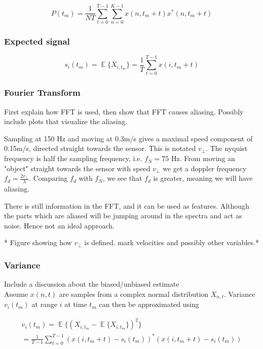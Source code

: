 \documentclass[a4paper, 12pt]{article}
\DeclareMathOperator*{\E}{\mathbb{E}}
\begin{document}
\begin{equation}
	P(t_m) = \frac{1}{NT}\sum_{t=0}^{T-1}\sum_{n=0}^{K-1}x(n, t_m + t)x^*(n, t_m + t)
\end{equation}

\subsubsection{Expected signal}

\begin{equation}
	s_i(t_m) = \E\{X_{i,t_m}\} = \frac{1}{T}\sum_{t=0}^{T-1}x(i, t_m + t)
\end{equation}


\subsubsection{Fourier Transform}
First explain how FFT is used, then show that FFT causes aliasing. Possibly include plots that visualize the aliasing.


Sampling at 150 Hz and moving at 0.3m/s gives a maximal speed component of 0.15m/s, directed straight towards the sensor. This is notated $v_{\perp}$. The nyquist frequency is half the sampling frequency, i.e. $f_N=75$ Hz. From moving an "object" straight towards the sensor with speed $v_{\perp}$ we get a doppler frequency $f_d = \frac{2v_{\perp}}{\lambda}$. Comparing $f_d$ with $f_N$, we see that $f_d$ is greater, meaning we will have aliasing.

There is still information in the FFT, and it can be used as features. Although the parts which are aliased will be jumping around in the spectra and act as noise. Hence not an ideal approach.

* Figure showing how $v_\perp$ is defined. mark velocities and possibly other variables.*



\subsubsection{Variance}

Include a discussion about the biased/unbiased estimate \\

Assume $x(n,t)$ are samples from a complex normal distribution $X_{n,t}$. Variance $v_i(t_m)$ at range $i$ at time $t_m$ can then be approximated using

\begin{equation}
\label{eq:var}
\begin{gathered}
	v_i(t_m) = \E\{ (X_{i,t_m} - \E\{X_{i,t_m}\})^2\} \\
	= \frac{1}{T-1}\sum_{t=0}^{T-1}(x(i, t_m + t) - s_i(t_m))^*(x(i, t_m + t) -  s_i(t_m))
\end{gathered}
\end{equation}
\end{document}
